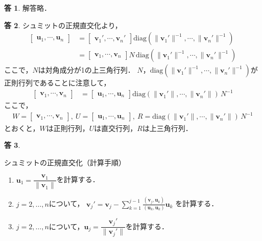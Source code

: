 \documentclass[dvipdfmx]{jsarticle}
\theoremstyle{definition}
\newtheorem{answer}{答}[section]
\begin{document}
\begin{answer}
    解答略．
\end{answer}

\begin{answer}
    シュミットの正規直交化より，
    \begin{align*}
        \begin{bmatrix} \bm{u}_1, \cdots, \bm{u}_n \end{bmatrix}
        &= \begin{bmatrix} \bm{v}_1', \cdots, \bm{v}_n' \end{bmatrix} \mathrm{diag}(\| \bm{v}_1' \|^{-1}, \cdots, \| \bm{v}_n' \|^{-1}) \\
        &= \begin{bmatrix} \bm{v}_1, \cdots, \bm{v}_n \end{bmatrix} N \, \mathrm{diag}(\| \bm{v}_1' \|^{-1}, \cdots, \| \bm{v}_n' \|^{-1})
    \end{align*}
    ここで，$N$は対角成分が1の上三角行列．
    $N$，$\mathrm{diag} (\| \bm{v}_1' \|^{-1}, \cdots, \| \bm{v}_n' \|^{-1})$が正則行列であることに注意して，
    \begin{align*}
        \begin{bmatrix} \bm{v}_1, \cdots, \bm{v}_n \end{bmatrix}
        &= \begin{bmatrix} \bm{u}_1, \cdots, \bm{u}_n \end{bmatrix} \mathrm{diag}(\| \bm{v}_1' \|, \cdots, \| \bm{v}_n' \|) \, N^{-1}
    \end{align*}
    ここで，
    \begin{align*}
        W = \begin{bmatrix} \bm{v}_1, \cdots, \bm{v}_n \end{bmatrix}, \
        U = \begin{bmatrix} \bm{u}_1, \cdots, \bm{u}_n \end{bmatrix}, \
        R = \mathrm{diag}(\| \bm{v}_1' \|, \cdots, \| \bm{v}_n' \|) \, N^{-1}
    \end{align*}
    とおくと，$W$は正則行列，$U$は直交行列，$R$は上三角行列．
\end{answer}

\begin{answer}
    \quad
    \begin{itembox}[l]{シュミットの正規直交化（計算手順）}
        \begin{enumerate}
            \item $\bm{u}_1 = \dfrac{\bm{v}_1}{\| \bm{v}_1 \|}$を計算する．  \label{calc_u1_exnorm}
            \item $j = 2, \ldots, n$について，
            $\bm{v}_j' = \bm{v}_j - {\displaystyle \sum_{k=1}^{j-1} \frac{(\bm{v}_j, \bm{u}_k)}{(\bm{u}_k, \bm{u}_k)}} \bm{u}_k$
            を計算する．  \label{calc_vjd_exnorm}
            \item $j = 2, \ldots, n$について，$\bm{u}_j = \dfrac{\bm{v}_j'}{\| \bm{v}_j' \|}$を計算する．  \label{calc_uj_exnorm}
        \end{enumerate}
    \end{itembox}
\end{answer}
\end{document}
